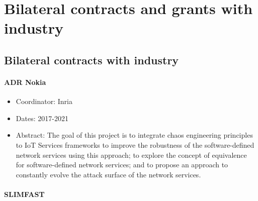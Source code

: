 








\section{Bilateral contracts and grants with industry}
\label{diverse:contracts-grants}


\subsection{Bilateral contracts with industry}
\label{diverse:contracts}




\paragraph*{ADR Nokia}

\begin{participants}
\end{participants}


\begin{itemize}\itemsep0cm
	\item Coordinator: Inria
	\item Dates: 2017-2021
	\item Abstract: The goal of this project is to integrate chaos engineering principles to IoT Services frameworks to improve the robustness of the software-defined network services using this approach;  to explore the concept of equivalence for software-defined network services; and to propose an approach to constantly evolve the attack surface of the network services.
\end{itemize}

\paragraph*{SLIMFAST}


